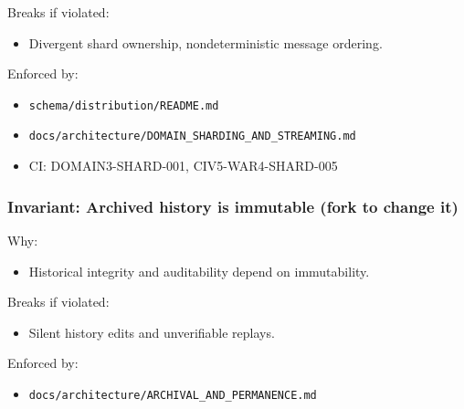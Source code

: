 \documentclass[9pt,a4paper,openany]{book}
\begin{document}
Breaks if violated:



\begin{itemize}
\item Divergent shard ownership, nondeterministic message ordering.\allowbreak{}
\end{itemize}


Enforced by:



\begin{itemize}
\item \texttt{schema/\allowbreak{}distribution/\allowbreak{}README.\allowbreak{}md}
\end{itemize}


\begin{itemize}
\item \texttt{docs/\allowbreak{}architecture/\allowbreak{}DOMAIN\_\allowbreak{}SHARDING\_\allowbreak{}AND\_\allowbreak{}STREAMING.\allowbreak{}md}
\end{itemize}


\begin{itemize}
\item CI: DOMAIN3-\allowbreak{}SHARD-\allowbreak{}001, CIV5-\allowbreak{}WAR4-\allowbreak{}SHARD-\allowbreak{}005
\end{itemize}





\subsubsection{Invariant: Archived history is immutable (fork to change it)}


Why:



\begin{itemize}
\item Historical integrity and auditability depend on immutability.\allowbreak{}
\end{itemize}


Breaks if violated:



\begin{itemize}
\item Silent history edits and unverifiable replays.\allowbreak{}
\end{itemize}


Enforced by:



\begin{itemize}
\item \texttt{docs/\allowbreak{}architecture/\allowbreak{}ARCHIVAL\_\allowbreak{}AND\_\allowbreak{}PERMANENCE.\allowbreak{}md}
\end{itemize}
\end{document}
